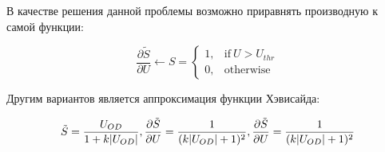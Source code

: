 \documentclass[a4paper,fontsize=12pt,titlepage,final]{scrartcl}
\begin{document}
\begin{figure}[!h]
\label{ris:spike_descrip}
\end{figure}

\newpage

В качестве решения данной проблемы возможно приравнять производную к самой функции:

$$ \frac{\partial \tilde{S}}{\partial U} \leftarrow S = \begin{cases} 1, &\text{if}~U> U_{thr} \\
0, &\text{otherwise}\end{cases} $$

Другим вариантов является аппроксимация функции Хэвисайда:

$$
    \tilde{S} = \frac{U_{OD}}{1+k|U_{OD}|},\\
    \frac{\partial \tilde{S}}{\partial U} = \frac{1}{(k|U_{OD}|+1)^2},\\
    \frac{\partial \tilde{S}}{\partial U} = \frac{1}{(k|U_{OD}|+1)^2}
$$

\begin{figure}[!h]
\label{ris:spike_descrip}
\end{figure}
\end{document}
